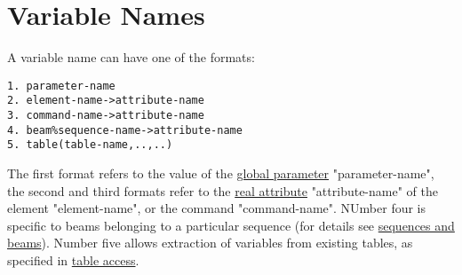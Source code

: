
\section{Variable Names}

A variable name can have one of the formats: 
\begin{verbatim}
1. parameter-name
2. element-name->attribute-name
3. command-name->attribute-name
4. beam%sequence-name->attribute-name
5. table(table-name,..,..)
\end{verbatim} 

The first format refers to the value of the \href{parameter.html}{global
  parameter} "parameter-name", the second and third formats refer to the
\href{real.html}{real attribute} "attribute-name" of the element
"element-name", or the command "command-name". NUmber four is specific
to beams belonging to a particular sequence (for details see
\href{sequence.html#beam}{sequences and beams}). Number five allows
extraction of variables from existing tables, as specified in
\href{expression.html#table}{table access}.  

